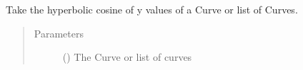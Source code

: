 \documentclass[letterpaper,10pt,english]{sphinxmanual}
\begin{document}
\begin{fulllineitems}
\label{\detokenize{pydv:pydvpy.cosh}}
Take the hyperbolic cosine of y values of a Curve or list of Curves.

\begin{sphinxVerbatim}[commandchars=\\\{\}]
  
\end{sphinxVerbatim}

\begin{sphinxVerbatim}[commandchars=\\\{\}]
 
\end{sphinxVerbatim}

\begin{sphinxVerbatim}[commandchars=\\\{\}]
\PYG{p}{[}\PYG{p}{]}
\end{sphinxVerbatim}
\begin{quote}\begin{description}
\item[{Parameters}] \leavevmode
{} ({\hyperref[\detokenize{pydv:curve.Curve}]{}}) \textendash{} The Curve or list of curves

\end{description}\end{quote}

\end{fulllineitems}

\end{document}
